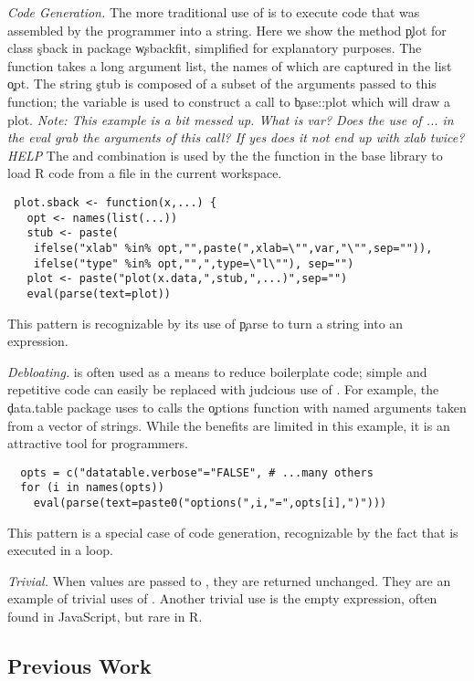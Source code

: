 \documentclass[screen,acmsmall]{acmart}
\newcommand{\mypara}[1]{\medskip\noindent\emph{#1}\xspace}
\newcommand{\NOTE}[1]{{\it Note: #1}\xspace}
\begin{document}
\mypara{Code Generation.} The more traditional use of \eval is to execute code
that was assembled by the programmer into a string. Here we show the method
\c{plot} for class \c{sback} in package \c{wsbackfit}, simplified for
explanatory purposes. The function takes a long argument list, the names of
which are captured in the list \c{opt}. The string \c{stub} is composed of a
subset of the arguments passed to this function; the variable is used to
construct a call to \c{base::plot} which will draw a plot. \NOTE{This example is
  a bit messed up. What is var? Does the use of ... in the eval grab the
  arguments of this call? If yes does it not end up with xlab twice? HELP} The
\parse and \eval combination is used by the the \source function in the base
library to load R code from a file in the current workspace.
\begin{lstlisting}
 plot.sback <- function(x,...) {
   opt <- names(list(...))
   stub <- paste(
    ifelse("xlab" %in% opt,"",paste(",xlab=\"",var,"\"",sep="")),
    ifelse("type" %in% opt,"",",type=\"l\""), sep="")
   plot <- paste("plot(x.data,",stub,",...)",sep="")
   eval(parse(text=plot))
\end{lstlisting}
This pattern is recognizable by its use of \c{parse} to turn a string
into an expression.


\mypara{Debloating.} \Eval is often used as a means to reduce
boilerplate code; simple and repetitive code can easily be replaced
with judcious use of \eval. For example, the \c{data.table} package
uses \eval to calls the \c{options} function with named arguments
taken from a vector of strings. While the benefits are limited in this
example, it is an attractive tool for programmers.
\begin{lstlisting}
  opts = c("datatable.verbose"="FALSE", # ...many others
  for (i in names(opts))
    eval(parse(text=paste0("options(",i,"=",opts[i],")")))
\end{lstlisting}
This pattern is a special case of code generation, recognizable by the
fact that \eval is executed in a loop.

\mypara{Trivial.} When values are passed to \eval, they are returned
unchanged. They are an example of trivial uses of \eval. Another
trivial use is the empty expression, often found in JavaScript, but
rare in R.


\subsection{Previous Work}
\end{document}
